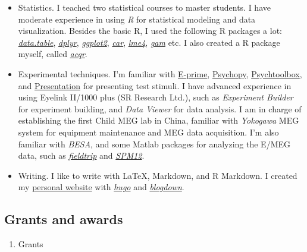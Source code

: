 \documentclass[10pt,]{article}
\providecommand{\tightlist}{%
  \setlength{\itemsep}{0pt}\setlength{\parskip}{0pt}}
\begin{document}
\begin{itemize}
\item
  Statistics. I teached two statistical courses to master students. I
  have moderate experience in using \emph{R} for statistical modeling
  and data visualization. Besides the basic R, I used the following R
  packages a lot: \href{http://r-datatable.com}{\emph{data.table}},
  \href{http://dplyr.tidyverse.org}{\emph{dplyr}},
  \href{http://ggplot2.tidyverse.org}{\emph{ggplot2}},
  \href{https://cran.r-project.org/web/packages/car/index.html}{\emph{car}},
  \href{https://github.com/lme4/lme4}{\emph{lme4}},
  \href{https://cran.r-project.org/web/packages/gam/index.html}{\emph{gam}}
  etc. I also created a R package myself, called
  \href{https://github.com/likanzhan/acqr}{\emph{acqr}}.
\item
  Experimental techniques. I'm familiar with
  \href{https://www.pstnet.com/eprime.cfm}{E-prime},
  \href{http://www.psychopy.org}{Psychopy},
  \href{http://psychtoolbox.org}{Psychtoolbox}, and
  \href{https://www.neurobs.com/presentation}{Presentation} for
  presenting test stimuli. I have advanced experience in using Eyelink
  II/1000 plus (SR Research Ltd.), such as \emph{Experiment Builder} for
  experiment building, and \emph{Data Viewer} for data analysis. I am in
  charge of establishing the first Child MEG lab in China, familiar with
  \emph{Yokogawa} MEG system for equipment maintenance and MEG data
  acquisition. I'm also familiar with \emph{BESA}, and some Matlab
  packages for analyzing the E/MEG data, such as
  \href{http://www.fieldtriptoolbox.org}{\emph{fieldtrip}} and
  \href{https://github.com/neurodebian/spm12}{\emph{SPM12}}.
\item
  Writing. I like to write with LaTeX, Markdown, and R Markdown. I
  created my \href{https://likan.info}{personal website} with
  \href{https://gohugo.io}{\emph{hugo}} and
  \href{https://github.com/rstudio/blogdown}{\emph{blogdown}}.
\end{itemize}

\hypertarget{grants-and-awards}{%
\subsection{Grants and awards}\label{grants-and-awards}}

\begin{enumerate}
\def\labelenumi{\arabic{enumi}.}
\tightlist
\item
  Grants
\end{enumerate}
\end{document}
